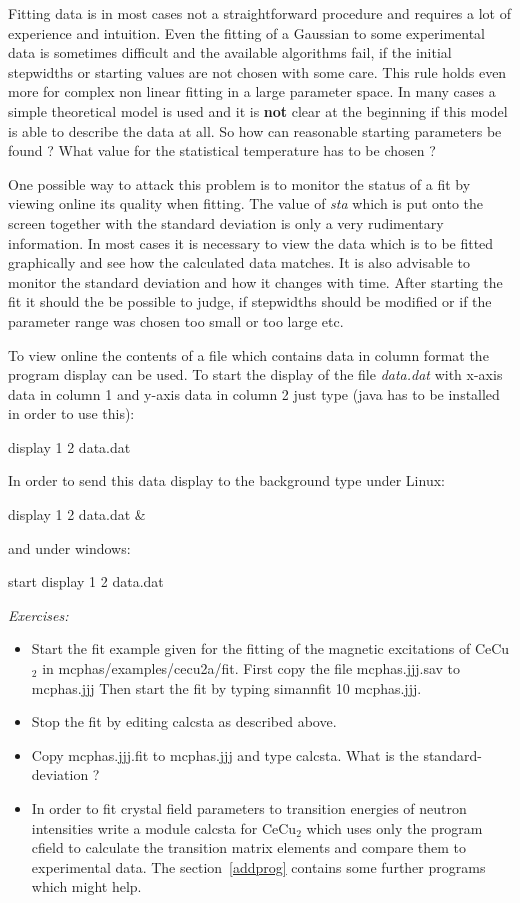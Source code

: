 Fitting data is in most cases not a straightforward procedure and requires
a lot of experience and intuition. Even the fitting of a Gaussian to some
experimental data is sometimes difficult and the available algorithms fail,
 if the initial
stepwidths or starting values are not chosen with some care.
This rule holds even more for complex non linear fitting in a large
parameter space. In many cases a simple theoretical model is used
and it is {\bf not} clear at the beginning if this model is able
to describe the data at all. 
So how can reasonable starting parameters be found ? What value
for the statistical temperature has to be chosen ?

One possible way to attack this problem is to monitor the status of a fit
by viewing online its quality when fitting. The value of {\em sta} which is put onto
the screen together with the standard deviation is only a very rudimentary information.
In most cases it is necessary to view the data which is to be fitted graphically and
see how the calculated data matches. It is also advisable to monitor the
standard deviation and how it changes with time. After starting the
fit it should the be possible to judge, if stepwidths should be modified or if
the parameter range was chosen too small or too large etc.

To view online the contents of a file which contains data in column format
the program {\prg display} can be used. To start the display of
the file {\em data.dat} with x-axis data in column 1 and y-axis data
in column 2 just type (java has to be installed in order to use this):

display 1 2 data.dat

In order to send this data display to the background type under Linux:

display 1 2 data.dat \&

and under windows:

start display 1 2 data.dat


\vspace{1cm}
{\em Exercises:}
\begin{itemize}
\item 
Start the fit example given for the fitting of the magnetic 
excitations of CeCu$_2$ in {\prg mcphas/examples/cecu2a/fit}.
First copy the file {\prg mcphas.jjj.sav} to {\prg mcphas.jjj}
Then start the fit by typing {\prg simannfit 10 mcphas.jjj}.
\item
Stop the fit by editing {\prg calcsta} as described above.
\item 
Copy {\prg mcphas.jjj.fit} to {\prg mcphas.jjj}  and type
{\prg calcsta}. What is the standard-deviation ? 
\item 
In order to fit  crystal field parameters to transition
energies of neutron intensities write a module
{\prg calcsta} for CeCu$_2$ which uses only the program
cfield to calculate the transition matrix elements
and compare them to experimental data.
The section~\ref{addprog} contains some further programs which
might help. 
\end{itemize}
